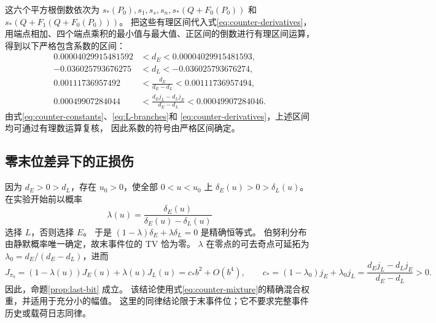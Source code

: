 这六个平方根倒数依次为
$s_*(P_0),s_1,s_s,s_n,s_*(Q+F_0(P_0))$ 和
$s_*(Q+F_1(Q+F_0(P_0)))$。
把这些有理区间代入式\eqref{eq:counter-derivatives}，
用端点相加、四个端点乘积的最小值与最大值、正区间的倒数进行有理区间运算，
得到以下严格包含系数的区间：
\begin{equation}
 \begin{split}
 0.00004029915481592&<d_E<0.00004029915481593,\\
 -0.036025793676275&<d_L<-0.036025793676274,\\
 0.00111736957492&<\frac{d_E}{d_E-d_L}<0.00111736957494,\\
 0.00049907284044&<
 \frac{d_Ej_L-d_Lj_E}{d_E-d_L}<0.00049907284046.
 \end{split}
 \label{eq:counter-intervals}
\end{equation}
由式\eqref{eq:counter-constants}、\eqref{eq:L-branches}和
\eqref{eq:counter-derivatives}，上述区间均可通过有理数运算复核，
因此系数的符号由严格区间确定。

\subsection{零末位差异下的正损伤}
因为 $d_E>0>d_L$，存在 $u_0>0$，使全部 $0<u<u_0$ 上
$\delta_E(u)>0>\delta_L(u)$。在实验开始前以概率
\begin{equation}
 \lambda(u)=\frac{\delta_E(u)}{\delta_E(u)-\delta_L(u)}
 \label{eq:counter-mixture}
\end{equation}
选择 $L$，否则选择 $E$。
于是 $(1-\lambda)\delta_E+\lambda\delta_L=0$ 是精确恒等式。
伯努利分布由静默概率唯一确定，故末事件位的 TV 恰为零。
$\lambda$ 在零点的可去奇点可延拓为
$\lambda_0=d_E/(d_E-d_L)$，进而
\begin{equation}
 J_{\pi_b}=(1-\lambda(u))J_E(u)+\lambda(u)J_L(u)
 =c_*b^2+O(b^4),\qquad
 c_*=(1-\lambda_0)j_E+\lambda_0j_L
     =\frac{d_Ej_L-d_Lj_E}{d_E-d_L}>0.
 \label{eq:counter-positive}
\end{equation}
因此，命题\ref{prop:last-bit} 成立。
该结论使用式\eqref{eq:counter-mixture}的精确混合权重，并适用于充分小的幅值。
这里的同律结论限于末事件位；它不要求完整事件历史或载荷日志同律。
